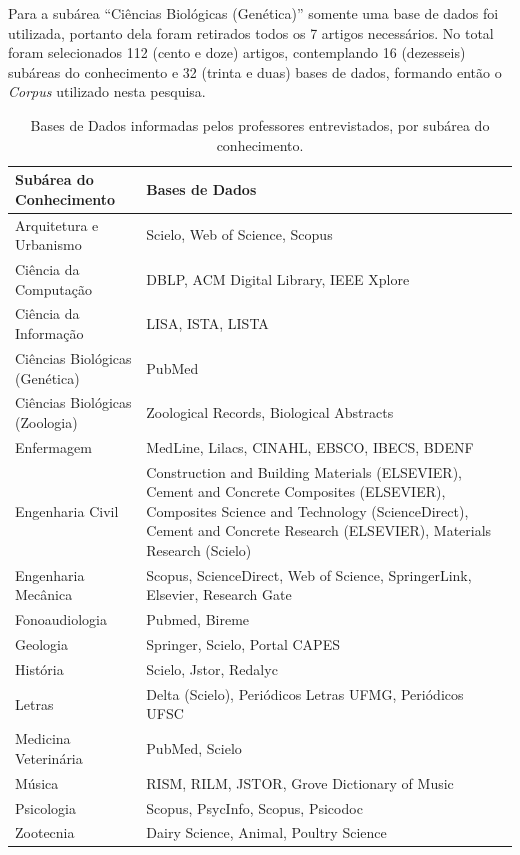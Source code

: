 Para a subárea ``Ciências Biológicas (Genética)'' somente uma base de dados foi utilizada, portanto dela foram retirados todos os 7 artigos necessários. No total foram selecionados 112 (cento e doze) artigos, contemplando 16 (dezesseis) subáreas do conhecimento e 32 (trinta e duas) bases de dados, formando então o \emph{Corpus} utilizado nesta pesquisa.

\begin{table}[h!]
    \caption{Bases de Dados informadas pelos professores entrevistados, por subárea do conhecimento.}
    \begin{center}
        \begin{tabular}{|p{6cm}|p{8cm}|}
            \hline 
            \textbf{Subárea do Conhecimento} & \textbf{Bases de Dados} \\ 
            \hline 
            Arquitetura e Urbanismo & Scielo, Web of Science, Scopus \\
            \hline
            Ciência da Computação & DBLP, ACM Digital Library, IEEE Xplore \\
            \hline
            Ciência da Informação & LISA, ISTA, LISTA \\
            \hline
            Ciências Biológicas (Genética) & PubMed \\
            \hline
            Ciências Biológicas (Zoologia) & Zoological Records, Biological Abstracts \\
            \hline
            Enfermagem & MedLine, Lilacs, CINAHL, EBSCO, IBECS, BDENF \\
            \hline
            Engenharia Civil & Construction and Building Materials (ELSEVIER), Cement and Concrete Composites (ELSEVIER), Composites Science and Technology (ScienceDirect), Cement and Concrete Research (ELSEVIER), Materials Research (Scielo) \\
            \hline
            Engenharia Mecânica & Scopus, ScienceDirect, Web of Science, SpringerLink, Elsevier, Research Gate \\
            \hline
            Fonoaudiologia & Pubmed, Bireme \\
            \hline
            Geologia & Springer, Scielo, Portal CAPES \\
            \hline
            História & Scielo, Jstor, Redalyc \\
            \hline
            Letras & Delta (Scielo), Periódicos Letras UFMG, Periódicos UFSC \\
            \hline
            Medicina Veterinária & PubMed, Scielo \\
            \hline
            Música & RISM, RILM, JSTOR, Grove Dictionary of Music \\
            \hline
            Psicologia & Scopus, PsycInfo, Scopus, Psicodoc \\
            \hline
            Zootecnia & Dairy Science, Animal, Poultry Science \\
            \hline
        \end{tabular}
    \end{center}
    \label{tab:databases}
\end{table}

